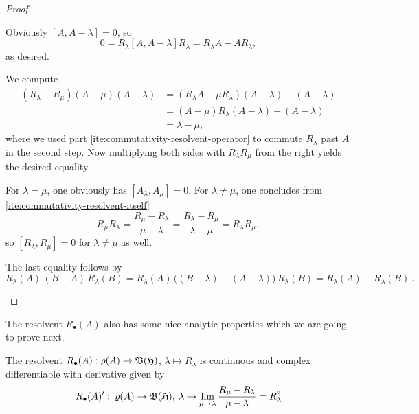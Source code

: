 \begin{proof}
\begin{adromanlist}
\item Obviously  $[A, A - \lambda] = 0$, so
  \[
    0 = R_\lambda [A, A - \lambda]R_\lambda = R_\lambda A - AR_\lambda,
  \]
as desired.
\setcounter{enumi}{2}
\item We compute
\begin{align*}
(R_\lambda - R_\mu)(A - \mu)(A - \lambda) &= (R_\lambda A - \mu R_\lambda)(A - \lambda) - (A - \lambda)\\
&= (A - \mu)R_\lambda (A - \lambda) - (A - \lambda)\\
&= \lambda - \mu ,
\end{align*}
where we used part \ref{ite:commutativity-resolvent-operator} to commute $R_\lambda$ past $A$ in the second step.
Now multiplying both sides with $R_\lambda R_\mu $ from the right yields the desired equality. 
\setcounter{enumi}{1}
\item 
  For $\lambda = \mu$, one obviously has $[A_\lambda, A_\mu] = 0$. For $\lambda \neq \mu$, one concludes from
  \ref{ite:commutativity-resolvent-itself}
  \[
     R_\mu R_\lambda = \frac{R_\mu - R_\lambda}{\mu - \lambda} = \frac{R_\lambda - R_\mu}{\lambda - \mu} = R_\lambda R_\mu,
  \]
  so $[R_\lambda, R_\mu] = 0$ for $\lambda \neq \mu $ as well.
\setcounter{enumi}{3}
\item  The  last equality follows by
  \[ R_\lambda(A)\, (B-A) \, R_\lambda (B) =  R_\lambda(A)\, \big((B-\lambda)-(A-\lambda) \big) \, R_\lambda (B) =
     R_\lambda(A) - R_\lambda (B) \ . \]
\end{adromanlist}
\end{proof}

The resolvent $R_\bullet (A)$ also has some nice analytic properties which we are going to prove next. 
\begin{proposition}\label{thm:resolvent-analytic-properties}
  The resolvent $R_\bullet (A) :\varrho(A) \rightarrow \mathfrak{B}(\mathfrak{H})$, $\lambda \mapsto R_\lambda$ is continuous and complex
  differentiable with derivative given by 
  \[
    R_\bullet(A)' :\: \varrho(A) \rightarrow \mathfrak{B}(\mathfrak{H}),  \: \lambda \mapsto \lim_{\mu \rightarrow \lambda} \frac{R_\mu - R_\lambda}{\mu - \lambda} =  R_\lambda^2
  \]
\end{proposition}

